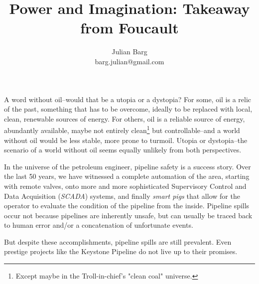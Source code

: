 \documentclass[12pt, man, natbib]{apa6}
\title{Power and Imagination: Takeaway from Foucault}
\author{Julian Barg\\barg.julian@gmail.com}
\affiliation{Ivey Business School}
\begin{document}
	
	\maketitle
	
	\singlespacing
	
	\section{}
	A word without oil--would that be a utopia or a dystopia? For some, oil is a relic of the past, something that has to be overcome, ideally to be replaced with local, clean, renewable sources of energy. For others, oil is a reliable source of energy, abundantly available, maybe not entirely clean\footnote{Except maybe in the Troll-in-chief's "clean coal" universe.} but controllable--and a world without oil would be less stable, more prone to turmoil. Utopia or dystopia--the scenario of a world without oil seems equally unlikely from both perspectives.
	
	In the universe of the petroleum engineer, pipeline safety is a success story. Over the last 50 years, we have witnessed a complete automation of the area, starting with remote valves, onto more and more sophisticated Supervisory Control and Data Acquisition (\textit{SCADA}) systems, and finally \textit{smart pigs} that allow for the operator to evaluate the condition of the pipeline from the inside. Pipeline spills occur not because pipelines are inherently unsafe, but can usually be traced back to human error and/or a concatenation of unfortunate events.
	
	But despite these accomplishments, pipeline spills are still prevalent. Even prestige projects like the Keystone Pipeline do not live up to their promises. 


\end{document}
